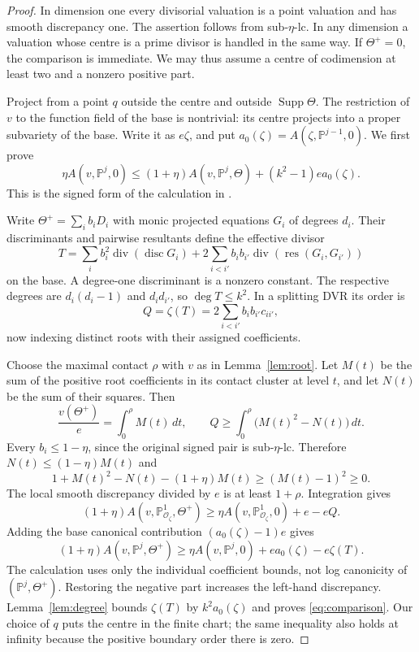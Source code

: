 \documentclass[11pt,reqno]{amsart}
\numberwithin{equation}{section}
\theoremstyle{definition}
\theoremstyle{remark}
\newcommand{\PP}{\mathbb P}
\newcommand{\OO}{\mathcal O}
\newcommand{\Supp}{\operatorname{Supp}}
\newcommand{\Div}{\operatorname{div}}
\begin{document}
\begin{proof}
In dimension one every divisorial valuation is a point valuation and has smooth discrepancy one. The assertion follows from sub-$\eta$-lc. In any dimension a valuation whose centre is a prime divisor is handled in the same way. If $\Theta^+=0$, the comparison is immediate. We may thus assume a centre of codimension at least two and a nonzero positive part.

Project from a point $q$ outside the centre and outside $\Supp\Theta$. The restriction of $v$ to the function field of the base is nontrivial: its centre projects into a proper subvariety of the base. Write it as $e\zeta$, and put $a_0(\zeta)=A(\zeta,\PP^{j-1},0)$. We first prove
\begin{equation}\label{eq:comparison}
 \eta A(v,\PP^j,0)
 \le(1+\eta)A(v,\PP^j,\Theta)
 +(k^2-1)e a_0(\zeta).
\end{equation}
This is the signed form of the calculation in \cite[Proposition~5.2]{Jiao}.

Write $\Theta^+=\sum_i b_iD_i$ with monic projected equations $G_i$ of degrees $d_i$. Their discriminants and pairwise resultants define the effective divisor
\[
 T=\sum_i b_i^2\Div(\operatorname{disc}G_i)
 +2\sum_{i<i'}b_i b_{i'}\Div(\operatorname{res}(G_i,G_{i'}))
\]
on the base. A degree-one discriminant is a nonzero constant. The respective degrees are $d_i(d_i-1)$ and $d_id_{i'}$, so $\deg T\le k^2$. In a splitting DVR its order is
\[
 Q=\zeta(T)=2\sum_{i<i'}b_i b_{i'}c_{ii'},
\]
now indexing distinct roots with their assigned coefficients.

Choose the maximal contact $\rho$ with $v$ as in Lemma~\ref{lem:root}. Let $M(t)$ be the sum of the positive root coefficients in its contact cluster at level $t$, and let $N(t)$ be the sum of their squares. Then
\[
 \frac{v(\Theta^+)}e=\int_0^\rho M(t)\,dt,
 \qquad Q\ge\int_0^\rho\bigl(M(t)^2-N(t)\bigr)\,dt.
\]
Every $b_i\le1-\eta$, since the original signed pair is sub-$\eta$-lc. Therefore $N(t)\le(1-\eta)M(t)$ and
\[
 1+M(t)^2-N(t)-(1+\eta)M(t)
 \ge(M(t)-1)^2\ge0.
\]
The local smooth discrepancy divided by $e$ is at least $1+\rho$. Integration gives
\[
 (1+\eta)A(v,\PP^1_{\OO_\zeta},\Theta^+)
 \ge\eta A(v,\PP^1_{\OO_\zeta},0)+e-eQ.
\]
Adding the base canonical contribution $(a_0(\zeta)-1)e$ gives
\[
 (1+\eta)A(v,\PP^j,\Theta^+)
 \ge\eta A(v,\PP^j,0)+e a_0(\zeta)-e\zeta(T).
\]
The calculation uses only the individual coefficient bounds, not log canonicity of $(\PP^j,\Theta^+)$. Restoring the negative part increases the left-hand discrepancy. Lemma~\ref{lem:degree} bounds $\zeta(T)$ by $k^2a_0(\zeta)$ and proves \eqref{eq:comparison}. Our choice of $q$ puts the centre in the finite chart; the same inequality also holds at infinity because the positive boundary order there is zero.


\end{proof}
\end{document}
